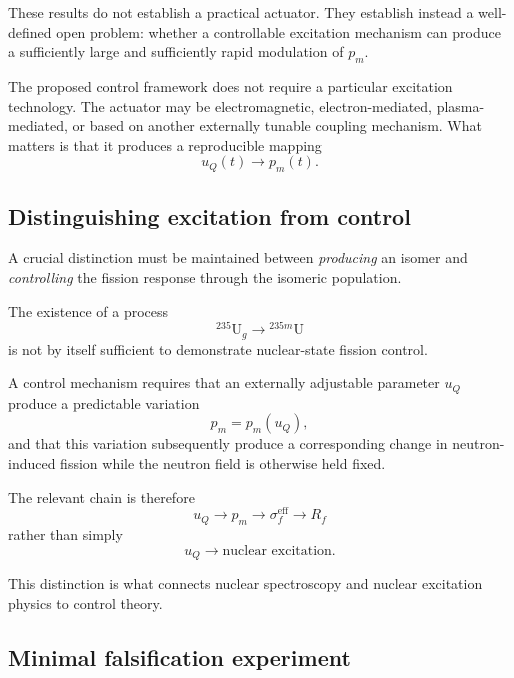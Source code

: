 These results do not establish a practical actuator. They establish instead a well-defined open problem: whether a controllable excitation mechanism can produce a sufficiently large and sufficiently rapid modulation of $p_m$.

The proposed control framework does not require a particular excitation technology. The actuator may be electromagnetic, electron-mediated, plasma-mediated, or based on another externally tunable coupling mechanism. What matters is that it produces a reproducible mapping
\begin{equation}
u_Q(t)\rightarrow p_m(t).
\end{equation}

\subsection{Distinguishing excitation from control}

A crucial distinction must be maintained between \emph{producing} an isomer and \emph{controlling} the fission response through the isomeric population.

The existence of a process
\begin{equation}
^{235}\mathrm{U}_g\rightarrow{}^{235m}\mathrm{U}
\end{equation}
is not by itself sufficient to demonstrate nuclear-state fission control.

A control mechanism requires that an externally adjustable parameter $u_Q$ produce a predictable variation
\begin{equation}
p_m=p_m(u_Q),
\end{equation}
and that this variation subsequently produce a corresponding change in neutron-induced fission while the neutron field is otherwise held fixed.

The relevant chain is therefore
\begin{equation}
\boxed{
u_Q
\rightarrow
p_m
\rightarrow
\sigma_f^{\mathrm{eff}}
\rightarrow
R_f
}
\end{equation}
rather than simply
\begin{equation}
u_Q\rightarrow\text{nuclear excitation}.
\end{equation}

This distinction is what connects nuclear spectroscopy and nuclear excitation physics to control theory.

\subsection{Minimal falsification experiment}

